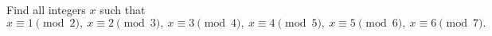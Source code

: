 Find all integers $x$ such that
\[x\equiv1\!\!\pmod2,\ x\equiv2\!\!\pmod3,\ x\equiv3\!\!\pmod4,\ x\equiv4\!\!\pmod5,\ x\equiv5\!\!\pmod6,\ x\equiv6\!\!\pmod7 .\]
